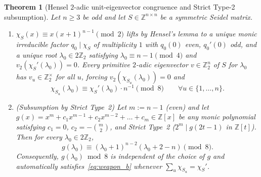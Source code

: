\documentclass[11pt,reqno]{amsart}
\newtheorem{theorem}{Theorem}[section]
\theoremstyle{definition}
\theoremstyle{remark}
\numberwithin{equation}{section}
\numberwithin{table}{section}
\begin{document}
\begin{theorem}[Hensel $2$-adic unit-eigenvector congruence and Strict Type-2 subsumption]\label{thm:weapon_b}
Let $n \ge 3$ be odd and let $S \in \mathbb{Z}^{n \times n}$ be a symmetric Seidel matrix.
\begin{enumerate}
  \item $\chi_S(x) \equiv x(x + 1)^{n - 1} \pmod 2$ lifts by Hensel's lemma to a unique monic irreducible factor $q_0 \mid \chi_S$ of multiplicity $1$ with $q_0(0)$ even, $q_0'(0)$ odd, and a unique root $\lambda_0 \in 2\mathbb{Z}_2$ satisfying $\lambda_0 \equiv n - 1 \pmod 4$ and $v_2(\chi_S'(\lambda_0)) = 0$. Every primitive $2$-adic eigenvector $v \in \mathbb{Z}_2^n$ of $S$ for $\lambda_0$ has $v_u \in \mathbb{Z}_2^\times$ for all $u$, forcing $v_2(\chi_{S_u}(\lambda_0)) = 0$ and
  \begin{equation}\label{eq:weapon_b}
    \chi_{S_u}(\lambda_0) \equiv \chi_S'(\lambda_0) \cdot n^{-1} \pmod{8} \qquad \forall u \in \{1, \dots, n\}.
  \end{equation}
  \item \emph{(Subsumption by Strict Type~2)} Let $m := n - 1$ (even) and let $g(x) = x^m + c_1 x^{m-1} + c_2 x^{m-2} + \dots + c_m \in \mathbb{Z}[x]$ be \emph{any} monic polynomial satisfying $c_1 = 0$, $c_2 = -\binom{m}{2}$, and Strict Type~2 ($2^m \mid g(2t - 1)$ in $\mathbb{Z}[t]$). Then for every $\lambda_0 \in 2\mathbb{Z}_2$,
  \begin{equation}\label{eq:strict_type2_mod8}
    g(\lambda_0) \equiv (\lambda_0 + 1)^{n - 2}(\lambda_0 + 2 - n) \pmod{8}.
  \end{equation}
  Consequently, $g(\lambda_0) \bmod 8$ is independent of the choice of $g$ and automatically satisfies~\eqref{eq:weapon_b} whenever $\sum_u \chi_{S_u} = \chi_S'$.
\end{enumerate}
\end{theorem}
\end{document}
